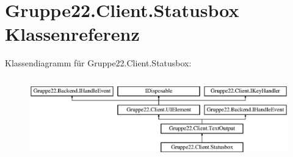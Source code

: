 \hypertarget{class_gruppe22_1_1_client_1_1_statusbox}{\section{Gruppe22.\-Client.\-Statusbox Klassenreferenz}
\label{class_gruppe22_1_1_client_1_1_statusbox}
}
Klassendiagramm für Gruppe22.\-Client.\-Statusbox\-:\begin{figure}[H]
\begin{center}
\leavevmode
\includegraphics[height=3.589744cm]{class_gruppe22_1_1_client_1_1_statusbox}
\end{center}
\end{figure}
